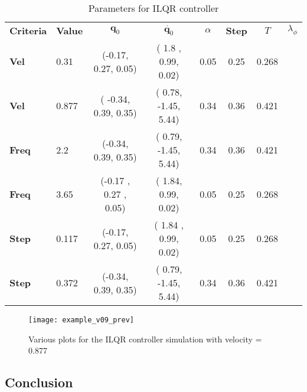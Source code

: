 \renewcommand{\arraystretch}{1.}
\begin{table}[!t]
	\centering    
      \caption{Parameters for ILQR controller}
      \label{tab:ilqr_result}
		
	\begin{tabular}{l l | c  c  c c c c}
		\toprule
\bf{Criteria} & \bf{Value} & $\bm{q}_0$ & $\dot{\bm{q}_0}$ & $\alpha$ &  \bf{Step} & $T$ & $\lambda_{\phi}$\\
\bf{Vel} & 0.31 & (-0.17,  0.27,  0.05) & (  1.8 ,  0.99,  0.02) &   0.05 & 0.25 & 0.268 \\
\bf{Vel} & 0.877 &( -0.34,  0.39,  0.35) & (  0.78, -1.45,  5.44) &   0.34&       0.36 & 0.421\\
\bf{Freq} & 2.2 & (-0.34,  0.39,  0.35) & ( 0.79, -1.45,  5.44) &   0.34&0.36 &0.421  \\
\bf{Freq} & 3.65 & (-0.17 ,  0.27 ,  0.05) & (  1.84,  0.99,  0.02) &   0.05 &        0.25 &0.268 \\
\bf{Step} & 0.117 &(-0.17,  0.27,  0.05) & (  1.84 ,  0.99,  0.02) &  0.05& 0.25& 0.268\\
\bf{Step} & 0.372 &(-0.34,  0.39,  0.35) & (  0.79, -1.45,  5.44) &   0.34& 0.36& 0.421 
	\end{tabular}
\end{table}




\begin{figure}
\texttt{[image: example\_v09\_prev]}
\caption{Various plots for the ILQR controller simulation with velocity = 0.877}
\label{fig:ilqr_plot}
\end{figure}

\subsection{Conclusion}
\label{sec:conclusion}
